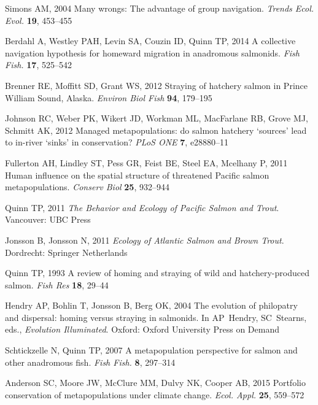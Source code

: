\documentclass{revtex4}
\begin{document}
\begin{thebibliography}{10}
Simons AM, 2004 {Many wrongs: The advantage of group navigation}.
\newblock \emph{Trends Ecol. Evol.} \textbf{19}, 453--455

Berdahl A, Westley PAH, Levin SA, Couzin ID, Quinn TP, 2014 {A collective
  navigation hypothesis for homeward migration in anadromous salmonids}.
\newblock \emph{Fish Fish.} \textbf{17}, 525--542

Brenner RE, Moffitt SD, Grant WS, 2012 {Straying of hatchery salmon in Prince
  William Sound, Alaska}.
\newblock \emph{Environ Biol Fish} \textbf{94}, 179--195

Johnson RC, Weber PK, Wikert JD, Workman ML, MacFarlane RB, Grove MJ, Schmitt
  AK, 2012 {Managed metapopulations: do salmon hatchery
  {\textquoteleft}sources{\textquoteright} lead to in-river
  {\textquoteleft}sinks{\textquoteright} in conservation?}
\newblock \emph{PLoS ONE} \textbf{7}, e28880--11

Fullerton AH, Lindley ST, Pess GR, Feist BE, Steel EA, Mcelhany P, 2011 {Human
  influence on the spatial structure of threatened Pacific salmon
  metapopulations}.
\newblock \emph{Conserv Biol} \textbf{25}, 932--944

Quinn TP, 2011 \emph{{The Behavior and Ecology of Pacific Salmon and Trout}}.
\newblock Vancouver: UBC Press

Jonsson B, Jonsson N, 2011 \emph{{Ecology of Atlantic Salmon and Brown Trout}}.
\newblock Dordrecht: Springer Netherlands

Quinn TP, 1993 {A review of homing and straying of wild and hatchery-produced
  salmon}.
\newblock \emph{Fish Res} \textbf{18}, 29--44

Hendry AP, Bohlin T, Jonsson B, Berg OK, 2004 {The evolution of philopatry and
  dispersal: homing versus straying in salmonids}.
\newblock In AP~Hendry, SC~Stearns, eds., \emph{Evolution Illuminated}. Oxford:
  Oxford University Press on Demand

Schtickzelle N, Quinn TP, 2007 {A metapopulation perspective for salmon and
  other anadromous fish}.
\newblock \emph{Fish Fish.} \textbf{8}, 297--314

Anderson SC, Moore JW, McClure MM, Dulvy NK, Cooper AB, 2015 {Portfolio
  conservation of metapopulations under climate change}.
\newblock \emph{Ecol. Appl.} \textbf{25}, 559--572


\end{thebibliography}
\end{document}
